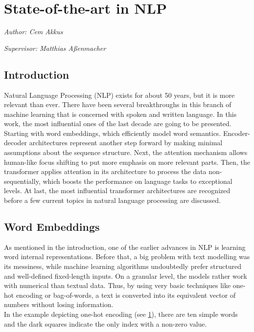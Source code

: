 \documentclass[
]{krantz}
\begin{document}
\hypertarget{c01-01-sota-nlp}{%
\section{State-of-the-art in NLP}\label{c01-01-sota-nlp}}

\emph{Author: Cem Akkus}

\emph{Supervisor: Matthias Aßenmacher}

\hypertarget{introduction-1}{%
\subsection{Introduction}\label{introduction-1}}

Natural Language Processing (NLP) exists for about 50 years, but it is
more relevant than ever. There have been several breakthroughs in this
branch of machine learning that is concerned with spoken and written
language. In this work, the most influential ones of the last decade are
going to be presented. Starting with word embeddings, which efficiently
model word semantics. Encoder-decoder architectures represent another
step forward by making minimal assumptions about the sequence structure.
Next, the attention mechanism allows human-like focus shifting to put
more emphasis on more relevant parts. Then, the transformer applies
attention in its architecture to process the data non-sequentially,
which boosts the performance on language tasks to exceptional levels. At
last, the most influential transformer architectures are recognized
before a few current topics in natural language processing are
discussed.

\hypertarget{word-embeddings}{%
\subsection{Word Embeddings}\label{word-embeddings}}

As mentioned in the introduction, one of the earlier advances in NLP is
learning word internal representations. Before that, a big problem with
text modelling was its messiness, while machine learning algorithms
undoubtedly prefer structured and well-defined fixed-length inputs. On a
granular level, the models rather work with numerical than textual data.
Thus, by using very basic techniques like one-hot encoding or
bag-of-words, a text is converted into its equivalent vector of numbers
without losing information.\\
In the example depicting one-hot encoding (see
\protect\hyperlink{fig:one-hot}{1}), there
are ten simple words and the dark squares indicate the only index with a
non-zero value.
\end{document}
